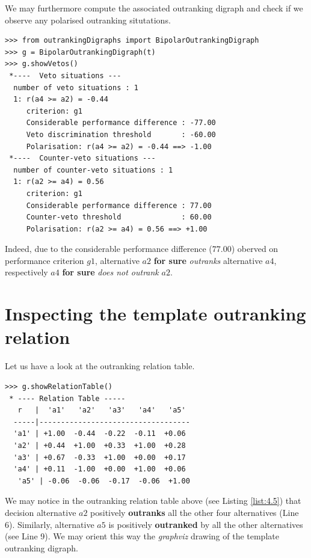 We may furthermore compute the associated outranking digraph and check if we observe any polarised outranking situtations.

\begin{lstlisting}[basicstyle=\footnotesize]
>>> from outrankingDigraphs import BipolarOutrankingDigraph
>>> g = BipolarOutrankingDigraph(t)
>>> g.showVetos()
 *----  Veto situations ---
  number of veto situations : 1 
  1: r(a4 >= a2) = -0.44
     criterion: g1
     Considerable performance difference : -77.00
     Veto discrimination threshold       : -60.00
     Polarisation: r(a4 >= a2) = -0.44 ==> -1.00
 *----  Counter-veto situations ---
  number of counter-veto situations : 1 
  1: r(a2 >= a4) = 0.56
     criterion: g1
     Considerable performance difference : 77.00
     Counter-veto threshold              : 60.00
     Polarisation: r(a2 >= a4) = 0.56 ==> +1.00
\end{lstlisting}

Indeed, due to the considerable performance difference ($77.00$) oberved on performance criterion $g1$, alternative $a2$ \textbf{for sure} \emph{outranks} alternative $a4$, respectively $a4$ \textbf{for sure} \emph{does not outrank} $a2$.

\section{Inspecting the template outranking relation}
\label{sec:4.6}

Let us have a look at the outranking relation table.

\begin{lstlisting}[caption={The template outranking relation},label=list:4.5,basicstyle=\footnotesize]
>>> g.showRelationTable()
 * ---- Relation Table -----
   r   |  'a1'   'a2'   'a3'   'a4'   'a5'   
  -----|-----------------------------------
  'a1' | +1.00  -0.44  -0.22  -0.11  +0.06  
  'a2' | +0.44  +1.00  +0.33  +1.00  +0.28  
  'a3' | +0.67  -0.33  +1.00  +0.00  +0.17  
  'a4' | +0.11  -1.00  +0.00  +1.00  +0.06  
   'a5' | -0.06  -0.06  -0.17  -0.06  +1.00
\end{lstlisting}

We may notice in the outranking relation table above (see Listing \ref{list:4.5}) that decision alternative $a2$ positively \textbf{outranks} all the other four alternatives  (Line 6). Similarly, alternative $a5$ is positively \textbf{outranked} by all the other alternatives (see Line 9). We may orient this way the \emph{graphviz} drawing of the template outranking digraph. 

